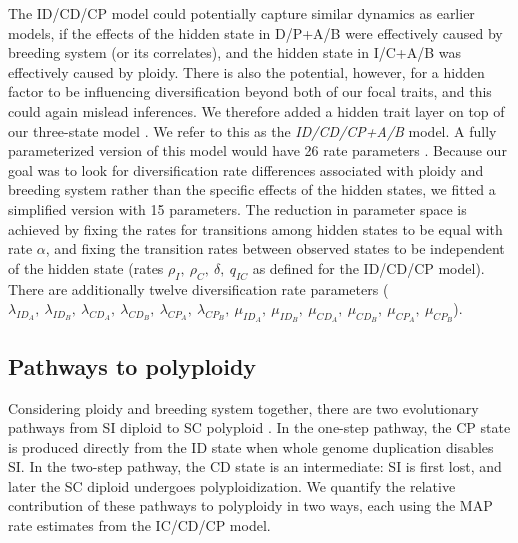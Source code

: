 The ID/CD/CP model could potentially capture similar dynamics as earlier models, if the effects of the hidden state in D/P+A/B were effectively caused by breeding system (or its correlates), and the hidden state in I/C+A/B was effectively caused by ploidy.
There is also the potential, however, for a hidden factor to be influencing diversification beyond both of our focal traits, and this could again mislead inferences.
We therefore added a hidden trait layer on top of our three-state model \citep[analogous to][]{caetano_2018, herrera_2018, huang_2018}.
We refer to this as the \textit{ID/CD/CP+A/B} model.
A fully parameterized version of this model would have 26 rate parameters \citep{herrera_2018}. 
Because our goal was to look for diversification rate differences associated with ploidy and breeding system rather than the specific effects of the hidden states, we fitted a simplified version with 15 parameters.
The reduction in parameter space is achieved by fixing the rates for transitions among hidden states to be equal with rate $\alpha$, and fixing the transition rates between observed states to be independent of the hidden state (rates $\rho_I,\ \rho_C,\ \delta,\ q_{IC}$ as defined for the ID/CD/CP model).
There are additionally twelve diversification rate parameters ($\lambda_{ID_A},\ \lambda_{ID_B},\ \lambda_{CD_A},\ \lambda_{CD_B},\ \lambda_{CP_A},\ \lambda_{CP_B},\ \mu_{ID_A},\ \mu_{ID_B},\ \mu_{CD_A},\ \mu_{CD_B},\ \mu_{CP_A},\ \mu_{CP_B}$).

\subsection{Pathways to polyploidy}

Considering ploidy and breeding system together, there are two evolutionary pathways from SI diploid to SC polyploid \citep{brunet2001, robertson_2011}.
In the one-step pathway, the CP state is produced directly from the ID state when whole genome duplication disables SI.
In the two-step pathway, the CD state is an intermediate: SI is first lost, and later the SC diploid undergoes polyploidization.
We quantify the relative contribution of these pathways to polyploidy in two ways, each using the MAP rate estimates from the IC/CD/CP model.

